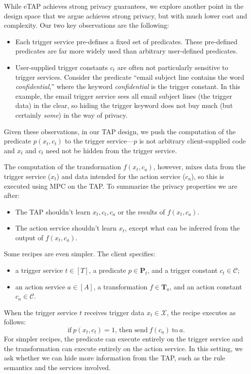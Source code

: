 While \textsf{eTAP} achieves strong privacy guarantees, we explore another point
in the design space that we argue achieves strong privacy, but with much lower
cost and complexity. Our two key observations are the following:
\begin{itemize}
  \item Each trigger service pre-defines a fixed set of predicates. These
    pre-defined predicates are far more widely used than arbitrary user-defined
    predicates.
  \item User-supplied trigger constants $c_t$ are often not particularly
    sensitive to trigger services. Consider the predicate ``email subject line
    contains the word \emph{confidential},'' where the keyword
    \emph{confidential} is the trigger constant. In this example, the email
    trigger service sees all email subject lines (the trigger data) in the
    clear, so hiding the trigger keyword does not buy much (but certainly
    \emph{some}) in the way of privacy.
\end{itemize}
Given these observations, in our TAP design, we push the computation of the
predicate $p(x_t, c_t)$ to the trigger service---$p$ is not arbitrary
client-supplied code and $x_t$ and $c_t$ need not be hidden from the trigger
service. 

The computation of the transformation $f(x_t, c_a)$, however, mixes data from
the trigger service ($x_t$) and data intended for the action service ($c_a$), so
this is executed using MPC on the TAP. To summarize the privacy properties we
are after:
\begin{itemize}
  \item The TAP shouldn't learn $x_t, c_t, c_a$ or the results of $f(x_t, c_a)$.
  \item The action service shouldn't learn $x_t$, except what can be inferred
    from the output of $f(x_t, c_a)$.
\end{itemize}

Some recipes are even simpler. The client specifies:
\begin{itemize}
  \item a trigger service $t \in [T]$, a predicate $p \in \mathbf{P}_t$, and a
    trigger constant $c_t \in \mathcal{C}$;
  \item an action service $a \in [A]$, a transformation $f \in \mathbf{T}_a$,
    and an action constant $c_a \in \mathcal{C}$.
\end{itemize}
When the trigger service $t$ receives trigger data $x_t \in \mathcal{X}$, the
recipe executes as follows:
\[
  \text{if}~p(x_t, c_t) = 1\text{, then send}~f(c_a)~\text{to}~a.
\]
For simpler recipes, the predicate can execute entirely on the trigger service
and the transformation can execute entirely on the action service. In this
setting, we ask whether we can hide more information from the TAP, such as the
rule semantics and the services involved.

